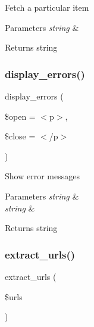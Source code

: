 Fetch a particular item


\begin{DoxyParams}{Parameters}
{\em string} & \\
\hline
\end{DoxyParams}
\begin{DoxyReturn}{Returns}
string 
\end{DoxyReturn}
\mbox{\label{class_c_i___trackback_a71a6f2e6d97ff5347257f101002bc903}} 
\subsubsection{\texorpdfstring{display\+\_\+errors()}{display\_errors()}}
{\footnotesize\ttfamily display\+\_\+errors (\begin{DoxyParamCaption}\item[{}]{\$open = {\ttfamily \textquotesingle{}$<$p$>$\textquotesingle{}},  }\item[{}]{\$close = {\ttfamily \textquotesingle{}$<$/p$>$\textquotesingle{}} }\end{DoxyParamCaption})}

Show error messages


\begin{DoxyParams}{Parameters}
{\em string} & \\
\hline
{\em string} & \\
\hline
\end{DoxyParams}
\begin{DoxyReturn}{Returns}
string 
\end{DoxyReturn}
\mbox{\label{class_c_i___trackback_aab29f333201544b83e318dd761ac797a}} 
\subsubsection{\texorpdfstring{extract\+\_\+urls()}{extract\_urls()}}
{\footnotesize\ttfamily extract\+\_\+urls (\begin{DoxyParamCaption}\item[{}]{\$urls }\end{DoxyParamCaption})}

